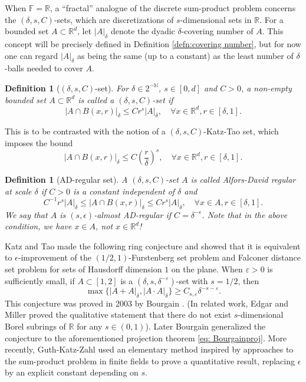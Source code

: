 \documentclass{amsart}
\newtheorem{definition}[prop]{Definition}
\newcommand{\R}{\mathbb{R}}
\newcommand{\eps}{\varepsilon}
\begin{document}
 When $\mathbb{F}=\mathbb{R}$, a ``fractal'' analogue of the discrete sum-product problem concerns the $(\delta, s, C)$-sets, which are discretizations of  $s$-dimensional sets in $\mathbb{R}$. For a bounded set $A \subset \R^d$, let $|A|_\delta$ denote the dyadic $\delta$-covering number of $A$. This concept will be precisely defined in Definition \ref{defn:covering number}, but for now one can regard $|A|_\delta$ as being the same (up to a constant) as the least number of $\delta$-balls needed to cover $A$.

 \begin{definition}[$(\delta, s, C)$-set]\label{defn:delta, s-set}
     For $\delta\in 2^{-\mathbb{N}}$, $s\in [0,d]$ and $C>0$, a non-empty bounded set $A\subset \mathbb{R}^d$ is called a $(\delta, s, C)$-set  if 
     \[
     |A\cap B(x,r)|_{\delta} \leq C r^{s} |A|_{\delta}, \quad \forall x\in \mathbb{R}^d, r\in [\delta, 1].
     \]
     \end{definition}

This is to be contrasted with the notion of a $(\delta, s, C)$-Katz-Tao set, which imposes the bound
\[
     |A\cap B(x,r)|_{\delta} \leq C \left( \frac{r}{\delta} \right)^{s}, \quad \forall x\in \mathbb{R}^d, r\in [\delta, 1].
     \]
     \begin{definition}[AD-regular set]\label{def: AD}
      A $(\delta,s, C)$-set  $A$ is called  Alfors-David regular  at scale $\delta$  if  $C>0$ is a constant independent of $\delta$ and 
      \[
     C^{-1} r^{s} |A|_{\delta}\leq |A\cap B(x,r)|_{\delta} \leq C r^{s} |A|_{\delta}, \quad \forall x\in A, r\in [\delta, 1].
     \]
  We say that $A$ is $(s, \epsilon)$-almost AD-regular if $C=\delta^{-\epsilon}$. Note that in the above condition, we have $x \in A$, not $x \in \R^d$!
 \end{definition}

 
Katz and Tao \cite{katz2001some} made the following ring conjecture and showed that it is equivalent to $\epsilon$-improvement of the $(1/2, 1)$-Furstenberg set problem and Falconer distance set problem for sets of Hausdorff dimension $1$ on the plane.    When $\eps>0$ is sufficiently small, if $A\subset [1,2]$ is a $(\delta, s, \delta^{-\eps})$-set with $s=1/2$, then 
\[
\max\{|A+A|_{\delta}, |A\cdot A|_{\delta}\} \geq C_{s, \eps} \delta^{-s-\eps}. 
\]
This conjecture was proved in 2003 by Bourgain  \cite{bourgain2003erdHos}. (In related work, Edgar and Miller \cite{edgar2003borel} proved the qualitative statement that there do not exist $s$-dimensional Borel subrings of $\R$ for any $s\in (0,1)$).  Later Bourgain generalized the conjecture to the aforementioned projection theorem \eqref{eq: Bourgainproj}. More recently, Guth-Katz-Zahl \cite{guth2021discretized} used an elementary method inspired by approaches to the sum-product problem in finite fields to prove a quantitative result, replacing $\epsilon$ by an explicit constant depending on $s$. 
 
\end{document}
